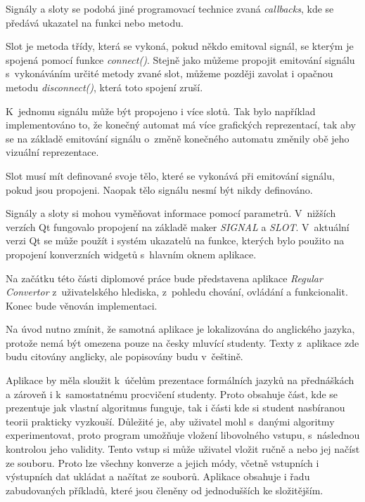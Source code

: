 
Signály a sloty se podobá jiné programovací technice zvaná \textit{callbacks}, kde se předává ukazatel na funkci nebo metodu. 

Slot je metoda třídy, která se vykoná, pokud někdo emitoval signál, se kterým je spojená pomocí funkce \textit{connect()}. Stejně jako můžeme propojit emitování signálu s~vykonáváním určité metody zvané slot, můžeme později zavolat i opačnou metodu \textit{disconnect()}, která toto spojení zruší. 

K~jednomu signálu může být propojeno i více slotů. Tak bylo například implementováno to, že konečný automat má více grafických reprezentací, tak aby se na základě emitování signálu o~změně konečného automatu změnily obě jeho vizuální reprezentace.

Slot musí mít definované svoje tělo, které se vykonává při emitování signálu, pokud jsou propojeni. Naopak tělo signálu nesmí být nikdy definováno.

Signály a sloty si mohou vyměňovat informace pomocí parametrů. V~nižších verzích Qt fungovalo propojení na základě maker \textit{SIGNAL} a \textit{SLOT}. V~aktuální verzi Qt se může použít i systém ukazatelů na funkce, kterých bylo použito na propojení konverzních widgetů s~hlavním oknem aplikace.



Na začátku této části diplomové práce bude představena aplikace \textit{Regular Convertor} z~uživatelského hlediska, z~pohledu chování, ovládání a funkcionalit. Konec bude věnován implementaci. 

Na úvod nutno zmínit, že samotná aplikace je lokalizována do anglického jazyka, protože nemá být omezena pouze na česky mluvící studenty.
Texty z~aplikace zde budu citovány anglicky, ale popisovány budu v~češtině. 

Aplikace by měla sloužit k~účelům prezentace formálních jazyků na přednáškách a zároveň i k~samostatnému procvičení studenty. Proto obsahuje část, kde se prezentuje jak vlastní algoritmus funguje, tak i části kde si student nasbíranou teorii prakticky vyzkouší. Důležité je, aby uživatel mohl s~danými algoritmy experimentovat, proto program umožňuje vložení libovolného vstupu, s~následnou kontrolou jeho validity. Tento vstup si může uživatel vložit ručně a nebo jej načíst ze souboru. Proto lze všechny konverze a jejich módy, včetně vstupních i výstupních dat ukládat a načítat ze souborů. Aplikace obsahuje i řadu zabudovaných příkladů, které jsou členěny od jednodušších ke složitějším.

